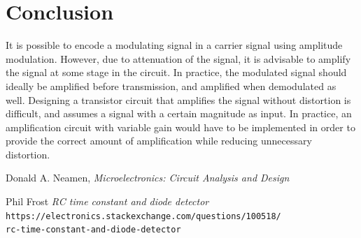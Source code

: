 \documentclass[12pt, a4paper]{article}
\begin{document}
\section{Conclusion} %
\label{sec:conclusion}
	It is possible to encode a modulating signal in a carrier signal using amplitude modulation. However, due to attenuation of the signal, it is advisable to amplify the signal at some stage in the circuit. In practice, the modulated signal should ideally be amplified before transmission, and amplified when demodulated as well. Designing a transistor circuit that amplifies the signal without distortion is difficult, and assumes a signal with a certain magnitude as input. In practice, an amplification circuit with variable gain would have to be implemented in order to provide the correct amount of amplification while reducing unnecessary distortion.

\begin{thebibliography}{500}

	  Donald A. Neamen,
	  \textit{Microelectronics: Circuit Analysis and Design}

	Phil Frost
	\textit{RC time constant and diode detector}
	\texttt{https://electronics.stackexchange.com/questions/100518/\\rc-time-constant-and-diode-detector}

\end{thebibliography}
\end{document}
